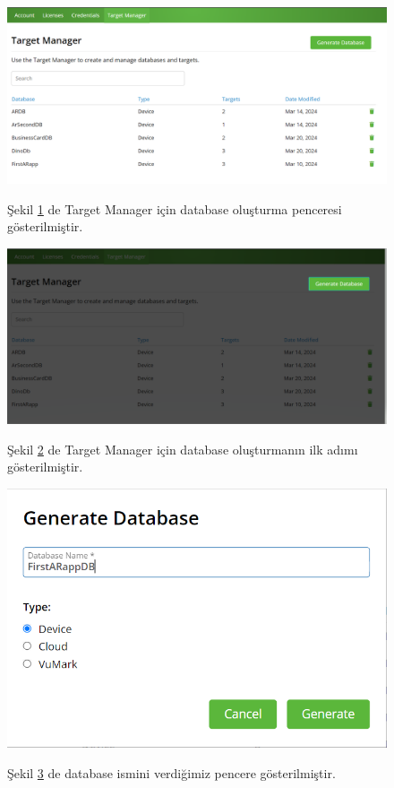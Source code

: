 \documentclass[12pt, a4paper]{article}
\begin{document}
	\begin{figure}[!ht]
		\caption{}
		\centering
		\includegraphics[angle=0, width=\textwidth]{Vuforia5.PNG}
		
		\label{gantt3}
		Şekil \ref{gantt3} de Target Manager için database oluşturma penceresi gösterilmiştir.\cite{Vuforia}	
	\end{figure}
	\newpage
	\begin{figure}[!ht]
		\caption{}
		\centering
		\includegraphics[angle=0, width=\textwidth]{Vuforia6.PNG}
		
		\label{gantt4}
		Şekil \ref{gantt4} de Target Manager için database oluşturmanın ilk adımı gösterilmiştir.\cite{Vuforia}	
	\end{figure}
	\begin{figure}[!ht]
		\caption{}
		\centering
		\includegraphics[angle=0, width=\textwidth]{Vuforia7.PNG}
		
		\label{gantt5}
		Şekil \ref{gantt5} de  database ismini verdiğimiz pencere gösterilmiştir.\cite{Vuforia}	
	\end{figure}
\end{document}
